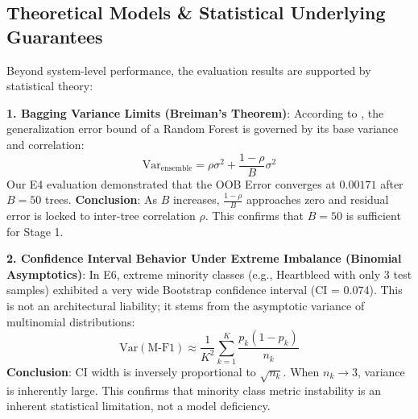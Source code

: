 \documentclass[sigconf]{acmart}
\begin{document}
\subsection{Theoretical Models \& Statistical Underlying Guarantees}

Beyond system-level performance, the evaluation results are supported by statistical theory:

\textbf{1. Bagging Variance Limits (Breiman's Theorem)}: According to \cite{11}, the generalization error bound of a Random Forest is governed by its base variance and correlation:
$$ \text{Var}_{\text{ensemble}} = \rho\sigma^2 + \frac{1-\rho}{B}\sigma^2 $$
Our E4 evaluation demonstrated that the OOB Error converges at $0.00171$ after $B=50$ trees. \textbf{Conclusion}: As $B$ increases, $\frac{1-\rho}{B}$ approaches zero and residual error is locked to inter-tree correlation $\rho$. This confirms that $B=50$ is sufficient for Stage 1.

\textbf{2. Confidence Interval Behavior Under Extreme Imbalance (Binomial Asymptotics)}: In E6, extreme minority classes (e.g., Heartbleed with only 3 test samples) exhibited a very wide Bootstrap confidence interval (CI = 0.074). This is not an architectural liability; it stems from the asymptotic variance of multinomial distributions:
$$ \text{Var}(\text{M-F1}) \approx \frac{1}{K^2} \sum_{k=1}^K \frac{p_k(1-p_k)}{n_k} $$
\textbf{Conclusion}: CI width is inversely proportional to $\sqrt{n_k}$. When $n_k \to 3$, variance is inherently large. This confirms that minority class metric instability is an inherent statistical limitation, not a model deficiency.
\end{document}
